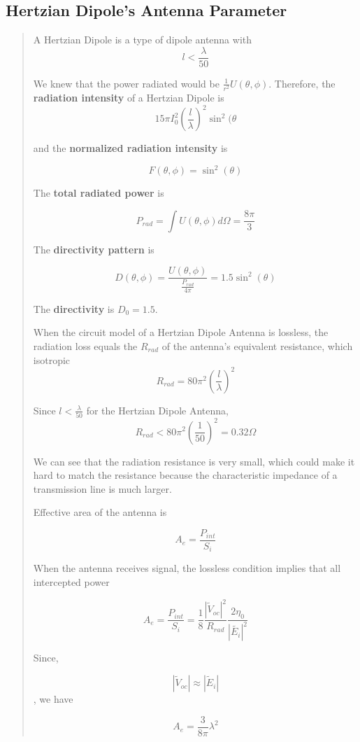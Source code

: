\documentclass{article} %
\begin{document}
\subsection{Hertzian Dipole's Antenna Parameter}
\begin{quote}
    A Hertzian Dipole is a type of dipole antenna with
    \[l < \frac{\lambda}{50} \]

    We knew that the power radiated would be $\frac{1}{r^2} U(\theta, \phi)$. Therefore, the \textbf{radiation intensity} of a Hertzian Dipole is
    \[15 \pi I_0 ^2\left(\frac{l}{\lambda}\right)^2 \sin^2(\theta\]

    and the \textbf{normalized radiation intensity} is

    \[F(\theta, \phi) = \sin^2(\theta)\]

    The \textbf{total radiated power} is

    \[P_{rad} = \int U(\theta, \phi) d\Omega = \frac{8 \pi}{3}\]

    The \textbf{directivity pattern} is

    \[D(\theta,\phi) = \frac{U(\theta, \phi)}{\frac{P_{rad}}{4 \pi}} = 1.5 \sin^2(\theta)\]

    The \textbf{directivity} is $D_0 = 1.5$.

    When the circuit model of a Hertzian Dipole Antenna is lossless, the radiation loss equals the $R_{rad}$ of the antenna's equivalent resistance, which isotropic
    \[R_{rad} = 80 \pi^2 \left(\frac{l}{\lambda}\right)^2\]

    Since $l < \frac{\lambda}{50}$ for the Hertzian Dipole Antenna,
    \[R_{rad} < 80 \pi^2 \left(\frac{1}{50}\right)^2 = 0.32 \Omega\]

    We can see that the radiation resistance is very small, which could make it hard to match the resistance because the characteristic impedance of a transmission line is much larger.

    Effective area of the antenna is

    \[A_e = \frac{P_{int}}{S_i}\]

    When the antenna receives signal, the lossless condition implies that all intercepted power

    \[A_e = \frac{P_{int}}{S_i} = \frac{1}{8}\frac{|\tilde{V}_{oc}|^2}{R_{rad}} \frac{2 \eta_0}{|\tilde{E_i}|^2}\]

    Since,

    \[|\tilde{V}_{oc} | \approx | \tilde{E}_i|\], we have

    \[A_e = \frac{3}{8 \pi} \lambda^2\]


\end{quote}
\end{document}
